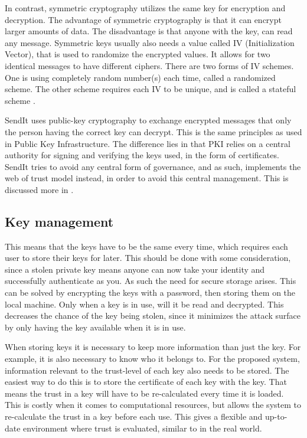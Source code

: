     In contrast, symmetric cryptography utilizes the same key for encryption and decryption. The advantage of symmetric cryptography is that it can encrypt larger amounts of data. The disadvantage is that anyone with the key, can read any message. Symmetric keys usually also needs a value called IV (Initialization Vector), that is used to randomize the encrypted values. It allows for two identical messages to have different ciphers. There are two forms of IV schemes. One is using completely random number(s) each time, called a randomized scheme. The other scheme requires each IV to be unique, and is called a stateful scheme \cite{bellareIntroductionModernCryptography2005}.

    SendIt uses public-key cryptography to exchange encrypted messages that only the person having the correct key can decrypt. This is the same principles as used in Public Key Infrastructure. The difference lies in that PKI relies on a central authority for signing and verifying the keys used, in the form of certificates. SendIt tries to avoid any central form of governance, and as such, implements the web of trust model instead, in order to avoid this central management. This is discussed more in .

    \subsection{Key management}
    This means that the keys have to be the same every time, which requires each user to store their keys for later. This should be done with some consideration, since a stolen private key means anyone can now take your identity and successfully authenticate as you. As such the need for secure storage arises. This can be solved by encrypting the keys with a password, then storing them on the local machine. Only when a key is in use, will it be read and decrypted. This decreases the chance of the key being stolen, since it minimizes the attack surface by only having the key available when it is in use.

    When storing keys it is necessary to keep more information than just the key. For example, it is also necessary to know who it belongs to. For the proposed system, information relevant to the trust-level of each key also needs to be stored. The easiest way to do this is to store the certificate of each key with the key. That means the trust in a key will have to be re-calculated every time it is loaded. This is costly when it comes to computational resources, but allows the system to re-calculate the trust  in a key before each use. This gives a flexible and up-to-date environment where trust is evaluated, similar to in the real world.

